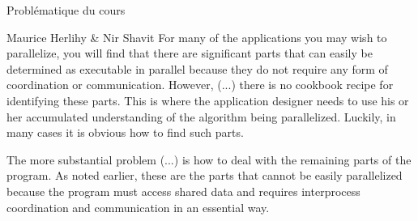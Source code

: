 
\begingroup

\begin{frame}{Problématique du cours}

  \begin{shadequote}{Maurice Herlihy \& Nir Shavit}
    For many of the applications you may wish to parallelize, you will find that there are significant parts that can easily be determined
    as executable in parallel because they do not require any form of coordination or communication. However, (...)
    \alert{there is no cookbook recipe for identifying these parts}. This is where the application designer needs to use
    his or her accumulated understanding of the algorithm being parallelized. Luckily, in many cases it is obvious how to find such parts.
    
    \vspace{4mm}
    \alert{The more substantial problem} (...)
    \alert{is how to deal with the remaining parts of the program.} As noted earlier, these are the parts that cannot be easily parallelized
    because the program must access shared data and requires interprocess coordination and communication in an essential way.
    \end{shadequote}

\end{frame}

\endgroup
\endinput
